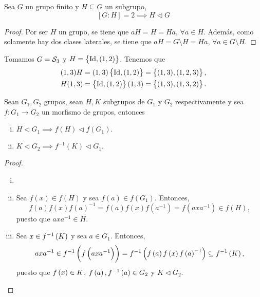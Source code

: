 \begin{prop}
    Sea $G$ un grupo finito y $H \subseteq G$ un subgrupo,
    \[
        [G:H] = 2 \implies H \triangleleft G
    \]
\end{prop}
\begin{proof}
    Por ser $H$ un grupo, se tiene que $aH=H=Ha, \,\forall a\in H$. Además, como solamente hay dos clases laterales, se tiene que $aH=G\setminus H=Ha,\,\forall a\in G\setminus H$.
\end{proof}

\begin{example}
    Tomamos $G = \mathcal{S}_3$ y $H = \left\{ \operatorname{Id}, (1,2)\right\}$. Tenemos que
    \[
        \begin{aligned}
            (1,3)H &= (1,3) \left\{\operatorname{Id}, (1,2)\right\} = \left\{(1,3), (1,2,3)\right\}, \\
            H(1,3) &= \left\{\operatorname{Id}, (1,2)\right\} (1,3) = \left\{(1,3), (1,3,2)\right\}.
        \end{aligned}
    \]
\end{example}

\begin{lema}
    Sean $G_1, G_2$ grupos, sean $H, K$ subgrupos de $G_1$ y $G_2$ respectivamente y sea $f \colon G_1 \to G_2$ un morfismo de grupos, entonces
    \begin{enumerate}[i)]
        \item $H \triangleleft G_1 \implies f(H) \triangleleft f\left(G_1 \right).$
        \item $K \triangleleft G_2 \implies f^{-1}(K) \triangleleft G_1.$
    \end{enumerate}
\end{lema}

\begin{proof}
    \begin{enumerate}[i)]
        \item[]
        \item Sea $f(x) \in f(H)$ y sea $f(a) \in f\left( G_1 \right)$. Entonces,
            \[
                f(a) f(x) f(a)^{-1} = f(a) f(x) f\left( a^{-1} \right) =
                f\left( axa^{-1} \right) \in f(H),
            \]
            puesto que $axa^{-1} \in H$.
        \item Sea $x\in f^{-1}\left( K\right)$ y sea $a\in G_1$. Entonces,
            \[
                axa^{-1} \in f^{-1}\left( f\left( axa^{-1} \right) \right) = f^{-1}\left( f\left( a\right) f\left( x\right) f\left( a\right) ^{-1} \right) \subseteq f^{-1}\left( K\right),
            \]
            puesto que $f\left( x\right)\in K$, $f\left( a\right), f^{-1}\left( a\right) \in G_2$ y $K \triangleleft G_2$.
    \end{enumerate}
\end{proof}

